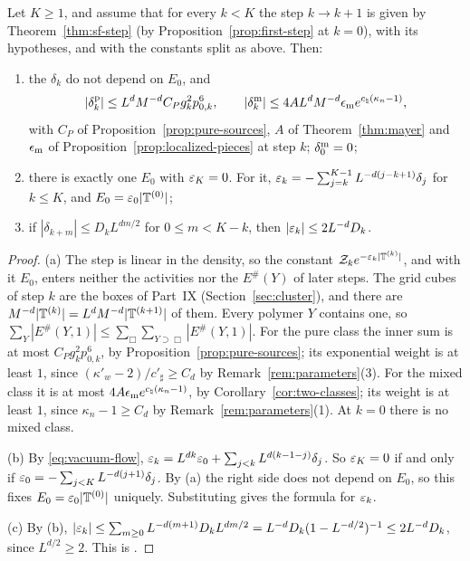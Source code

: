 \begin{proposition}\label{prop:vacuum}
Let $K\ge1$, and assume that for every $k<K$ the step $k\to k+1$ is given by Theorem~\ref{thm:sf-step} (by Proposition~\ref{prop:first-step} at $k=0$), with its hypotheses, and with the constants split as above. Then:
\begin{enumerate}[label=(\alph*)]
\item the $\delta_k$ do not depend on $E_0$, and
\[
|\delta^{\rm p}_k|\le L^dM^{-d}C_Pg_k^2p_{0,k}^6,\qquad|\delta^{\rm m}_k|\le4AL^dM^{-d}\epsilon_{\rm m}e^{c_\natural(\kappa_n-1)},
\]
with $C_P$ of Proposition~\ref{prop:pure-sources}, $A$ of Theorem~\ref{thm:mayer} and $\epsilon_{\rm m}$ of Proposition~\ref{prop:localized-pieces} at step $k$; $\delta^{\rm m}_0=0$;
\item there is exactly one $E_0$ with $\varepsilon_K=0$. For it, $\varepsilon_k=-\sum_{j=k}^{K-1}L^{-d(j-k+1)}\delta_j$ for $k\le K$, and $E_0=\varepsilon_0|\mathbb T^{(0)}|$;
\item if $|\delta_{k+m}|\le D_kL^{dm/2}$ for $0\le m<K-k$, then $|\varepsilon_k|\le2L^{-d}D_k$.
\end{enumerate}
\end{proposition}

\begin{proof}
(a) The step is linear in the density, so the constant $\mathcal Z_ke^{-\varepsilon_k|\mathbb T^{(k)}|}$, and with it $E_0$, enters neither the activities nor the $E^\#(Y)$ of later steps. The grid cubes of step $k$ are the boxes of Part~IX (Section~\ref{sec:cluster}), and there are $M^{-d}|\mathbb T^{(k)}|=L^dM^{-d}|\mathbb T^{(k+1)}|$ of them. Every polymer $Y$ contains one, so $\sum_Y|E^\#(Y,1)|\le\sum_\Box\sum_{Y\supset\Box}|E^\#(Y,1)|$. For the pure class the inner sum is at most $C_Pg_k^2p_{0,k}^6$, by Proposition~\ref{prop:pure-sources}; its exponential weight is at least $1$, since $(\kappa'_w-2)/c'_\sharp\ge C_d$ by Remark~\ref{rem:parameters}(3). For the mixed class it is at most $4A\epsilon_{\rm m}e^{c_\natural(\kappa_n-1)}$, by Corollary~\ref{cor:two-classes}; its weight is at least $1$, since $\kappa_n-1\ge C_d$ by Remark~\ref{rem:parameters}(1). At $k=0$ there is no mixed class.

(b) By \eqref{eq:vacuum-flow}, $\varepsilon_k=L^{dk}\varepsilon_0+\sum_{j<k}L^{d(k-1-j)}\delta_j$. So $\varepsilon_K=0$ if and only if $\varepsilon_0=-\sum_{j<K}L^{-d(j+1)}\delta_j$. By (a) the right side does not depend on $E_0$, so this fixes $E_0=\varepsilon_0|\mathbb T^{(0)}|$ uniquely. Substituting gives the formula for $\varepsilon_k$.

(c) By (b), $|\varepsilon_k|\le\sum_{m\ge0}L^{-d(m+1)}D_kL^{dm/2}=L^{-d}D_k(1-L^{-d/2})^{-1}\le2L^{-d}D_k$, since $L^{d/2}\ge2$. This is \cite[Theorem~24, (284)--(288)]{DimockI}.
\end{proof}

